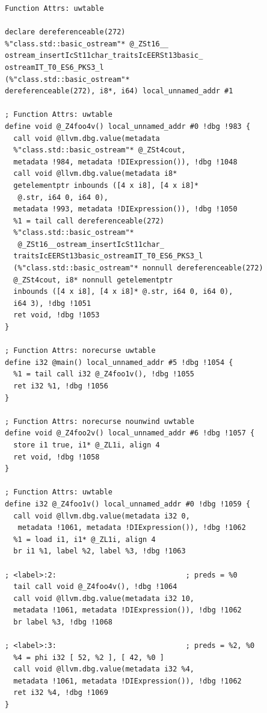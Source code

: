 \documentclass[12pt,oneside]{memoir}
\begin{document}
\begin{lstlisting}[frame=single,caption={Међурепрезентација без оптимизације целовитог програма}, captionpos=b]
 Function Attrs: uwtable

declare dereferenceable(272) 
%"class.std::basic_ostream"* @_ZSt16__
ostream_insertIcSt11char_traitsIcEERSt13basic_
ostreamIT_T0_ES6_PKS3_l
(%"class.std::basic_ostream"* 
dereferenceable(272), i8*, i64) local_unnamed_addr #1

; Function Attrs: uwtable
define void @_Z4foo4v() local_unnamed_addr #0 !dbg !983 {
  call void @llvm.dbg.value(metadata 
  %"class.std::basic_ostream"* @_ZSt4cout, 
  metadata !984, metadata !DIExpression()), !dbg !1048
  call void @llvm.dbg.value(metadata i8* 
  getelementptr inbounds ([4 x i8], [4 x i8]*
   @.str, i64 0, i64 0), 
  metadata !993, metadata !DIExpression()), !dbg !1050
  %1 = tail call dereferenceable(272) 
  %"class.std::basic_ostream"*
   @_ZSt16__ostream_insertIcSt11char_
  traitsIcEERSt13basic_ostreamIT_T0_ES6_PKS3_l
  (%"class.std::basic_ostream"* nonnull dereferenceable(272) 
  @_ZSt4cout, i8* nonnull getelementptr 
  inbounds ([4 x i8], [4 x i8]* @.str, i64 0, i64 0), 
  i64 3), !dbg !1051
  ret void, !dbg !1053
}

; Function Attrs: norecurse uwtable
define i32 @main() local_unnamed_addr #5 !dbg !1054 {
  %1 = tail call i32 @_Z4foo1v(), !dbg !1055
  ret i32 %1, !dbg !1056
}

; Function Attrs: norecurse nounwind uwtable
define void @_Z4foo2v() local_unnamed_addr #6 !dbg !1057 {
  store i1 true, i1* @_ZL1i, align 4
  ret void, !dbg !1058
}

; Function Attrs: uwtable
define i32 @_Z4foo1v() local_unnamed_addr #0 !dbg !1059 {
  call void @llvm.dbg.value(metadata i32 0,
   metadata !1061, metadata !DIExpression()), !dbg !1062
  %1 = load i1, i1* @_ZL1i, align 4
  br i1 %1, label %2, label %3, !dbg !1063

; <label>:2:                              ; preds = %0
  tail call void @_Z4foo4v(), !dbg !1064
  call void @llvm.dbg.value(metadata i32 10, 
  metadata !1061, metadata !DIExpression()), !dbg !1062
  br label %3, !dbg !1068

; <label>:3:                              ; preds = %2, %0
  %4 = phi i32 [ 52, %2 ], [ 42, %0 ]
  call void @llvm.dbg.value(metadata i32 %4, 
  metadata !1061, metadata !DIExpression()), !dbg !1062
  ret i32 %4, !dbg !1069
}

\end{lstlisting}
\end{document}
